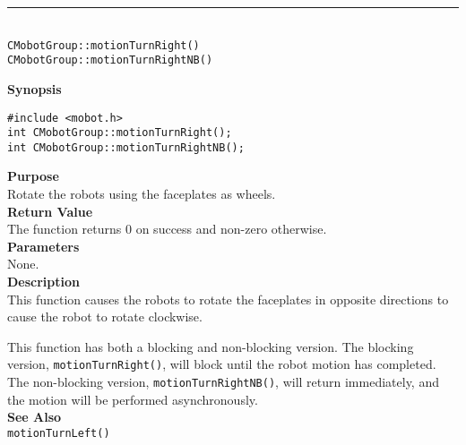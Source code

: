 \noindent
\vspace{5pt}
\rule{4.5in}{0.015in}\\
\noindent
{\LARGE \texttt{CMobotGroup::motionTurnRight()}}\\
{\LARGE \texttt{CMobotGroup::motionTurnRightNB()}}\\
{}

\noindent
{\bf Synopsis}
\vspace{-8pt}
\begin{verbatim}
#include <mobot.h>
int CMobotGroup::motionTurnRight();
int CMobotGroup::motionTurnRightNB();
\end{verbatim}

\noindent
{\bf Purpose}\\
Rotate the robots using the faceplates as wheels.\\

\noindent
{\bf Return Value}\\
The function returns 0 on success and non-zero otherwise.\\

\noindent
{\bf Parameters}\\
None.\\

\noindent
{\bf Description}\\
This function causes the robots to rotate the faceplates in opposite directions
to cause the robot to rotate clockwise.

This function has both a blocking and non-blocking version.
The blocking version, \texttt{motionTurnRight()}, will block until the
robot motion has completed. The non-blocking version, \texttt{motionTurnRightNB()},
will return immediately, and the motion will be performed asynchronously.\\

\noindent
{\bf See Also}\\
\texttt{motionTurnLeft()}

